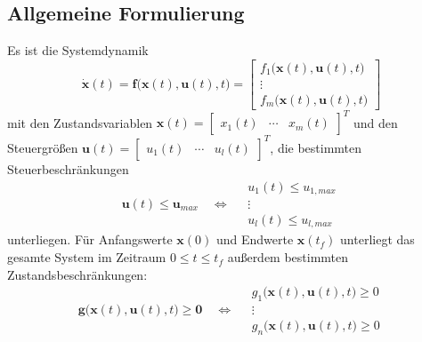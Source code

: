 \documentclass[a4paper, 11pt, accentcolor = tud3b]{tudreport}
\renewcommand{\vec}[1]{\boldsymbol{\mathbf{#1}}}
\begin{document}
			\subsection{Allgemeine Formulierung}
				Es ist die Systemdynamik
				\begin{equation*}
					\dot{\vec{x}}(t) = \vec{f}\big(\vec{x}(t), \vec{u}(t), t\big) =
						\begin{bmatrix}
							f_1\big(\vec{x}(t), \vec{u}(t), t\big) \\
							\vdots \\
							f_m\big(\vec{x}(t), \vec{u}(t), t\big)
						\end{bmatrix}
				\end{equation*}
				mit den Zustandsvariablen \( \vec{x}(t) = \begin{bmatrix} x_1(t) & \cdots & x_m(t) \end{bmatrix}^T \) und den Steuergrößen \( \vec{u}(t) = \begin{bmatrix} u_1(t) & \cdots & u_l(t) \end{bmatrix}^T \), die bestimmten Steuerbeschränkungen
				\begin{equation*}
					\vec{u}(t) \leq \vec{u}_\mathit{max} \quad\iff\quad
						\begin{matrix}
							u_1(t) \leq u_{1, \mathit{max}} \\
							\vdots \\
							u_l(t) \leq u_{l, \mathit{max}}
						\end{matrix}
				\end{equation*}
				unterliegen. Für Anfangswerte \( \vec{x}(0) \) und Endwerte \( \vec{x}(t_f) \) unterliegt das gesamte System im Zeitraum \( 0 \leq t \leq t_f \) außerdem bestimmten Zustandsbeschränkungen:
				\begin{equation*}
					\vec{g}\big(\vec{x}(t), \vec{u}(t), t\big) \geq \vec{0} \quad\iff\quad
						\begin{matrix}
							g_1\big(\vec{x}(t), \vec{u}(t), t\big) \geq 0 \\
							\vdots \\
							g_n\big(\vec{x}(t), \vec{u}(t), t\big) \geq 0
						\end{matrix}
				\end{equation*}
				
\end{document}
